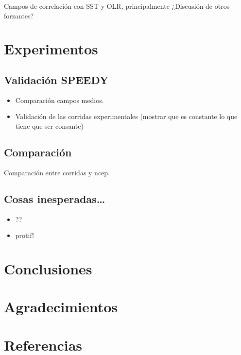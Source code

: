 \documentclass[spanish,a4paper]{book}
\providecommand{\tightlist}{%
  \setlength{\itemsep}{0pt}\setlength{\parskip}{0pt}}
\begin{document}
Campos de correlación con SST y OLR, principalmente ¿Discusión de otros
forzantes?

\chapter{Experimentos}\label{experimentos}

\section{Validación SPEEDY}\label{validacion-speedy}

\begin{itemize}
\tightlist
\item
  Comparación campos medios.
\item
  Validación de las corridas experimentales (mostrar que es constante lo
  que tiene que ser consante)
\end{itemize}

\section{Comparación}\label{comparacion}

Comparación entre corridas y ncep.

\section{Cosas inesperadas\ldots{}}\label{cosas-inesperadas}

\begin{itemize}
\tightlist
\item
  ??
\item
  protif!
\end{itemize}

\chapter{Conclusiones}\label{conclusiones}

\chapter{Agradecimientos}\label{agradecimientos}

\chapter{Referencias}\label{referencias}
\end{document}
